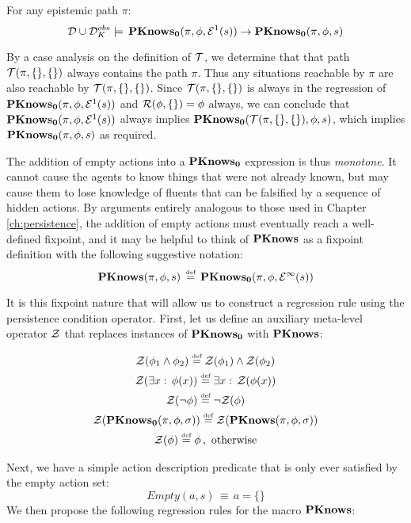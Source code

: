 \begin{thm}
\label{thm:En_impl_En-1}For any epistemic path $\pi$: \[
\mathcal{D}\cup\mathcal{D}_{K}^{obs}\models\,\mathbf{PKnows_{0}}(\pi,\phi,\mathcal{E}^{1}(s))\rightarrow\mathbf{PKnows_{0}}(\pi,\phi,s)\]

\end{thm}
\begin{proofsketch}
By a case analysis on the definition of $\mathcal{T}$, we determine that
that path $\mathcal{T}(\pi,\{\},\{\})$ always contains the path $\pi$.
Thus any situations reachable by $\pi$ are also reachable by $\mathcal{T}(\pi,\{\},\{\})$.
Since $\mathcal{T}(\pi,\{\},\{\})$ is always in the regression of $\mathbf{PKnows_{0}}(\pi,\phi,\mathcal{E}^{1}(s))$
and $\mathcal{R}(\phi,\{\})=\phi$ always, we can conclude that $\mathbf{PKnows_{0}}(\pi,\phi,\mathcal{E}^{1}(s))$
always implies $\mathbf{PKnows_{0}}(\mathcal{T}(\pi,\{\},\{\}),\phi,s)$, which implies
$\mathbf{PKnows_{0}}(\pi,\phi,s)$ as required. 
\end{proofsketch}
The addition of empty actions into a $\mathbf{PKnows_{0}}$ expression is thus
\emph{monotone}. It cannot cause the agents to know things that were
not already known, but may cause them to lose knowledge of fluents
that can be falsified by a sequence of hidden actions. By arguments
entirely analogous to those used in Chapter \ref{ch:persistence},
the addition of empty actions must eventually reach a well-defined
fixpoint, and it may be helpful to think of $\mathbf{PKnows}$ as a fixpoint
definition with the following suggestive notation:\[
\mathbf{PKnows}(\pi,\phi,s)\,\stackrel{\mbox{\tiny def}}{=}\,\mathbf{PKnows_{0}}(\pi,\phi,\mathcal{E}^{\infty}(s))\]


It is this fixpoint nature that will allow us to construct a regression
rule using the persistence condition operator. First, let us define
an auxiliary meta-level operator $\mathcal{Z}$ that replaces instances of
$\mathbf{PKnows_{0}}$ with $\mathbf{PKnows}$:

\begin{gather*}
\mathcal{Z}(\phi_{1}\wedge\phi_{2})\stackrel{\mbox{\tiny def}}{=}\mathcal{Z}(\phi_{1})\wedge\mathcal{Z}(\phi_{2})\\
\mathcal{Z}(\exists x:\,\phi(x))\stackrel{\mbox{\tiny def}}{=}\exists x:\,\mathcal{Z}(\phi(x))\\
\mathcal{Z}(\neg\phi)\stackrel{\mbox{\tiny def}}{=}\neg\mathcal{Z}(\phi)\\
\mathcal{Z}(\mathbf{PKnows_{0}}(\pi,\phi,\sigma))\stackrel{\mbox{\tiny def}}{=}\mathcal{Z}(\mathbf{PKnows}(\pi,\phi,\sigma))\\
\mathcal{Z}(\phi)\stackrel{\mbox{\tiny def}}{=}\phi\,,\,\,\mathrm{otherwise}\end{gather*}


Next, we have a simple action description predicate that is only ever
satisfied by the empty action set:\[
Empty(a,s)\,\equiv\, a=\{\}\]
 We then propose the following regression rules for the macro $\mathbf{PKnows}$:


